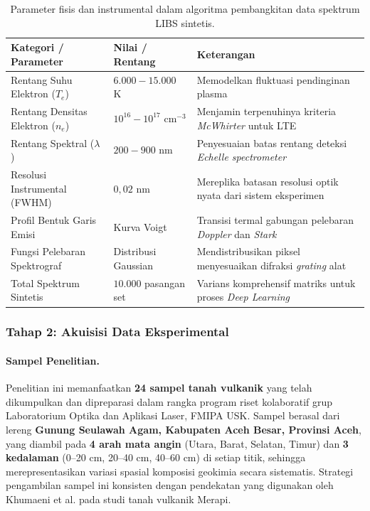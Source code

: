 \documentclass[12pt, a4paper]{article}
\begin{document}
\begin{table}[htbp]
\centering
\caption{Parameter fisis dan instrumental dalam algoritma pembangkitan data spektrum LIBS sintetis.}
\label{tab:parameter-simulasi}
\small
\begin{tabular}{llp{5.5cm}}
\toprule
\textbf{Kategori / Parameter} & \textbf{Nilai / Rentang} & \textbf{Keterangan} \\
\midrule
Rentang Suhu Elektron ($T_e$) & $6.000 - 15.000$ K & Memodelkan fluktuasi pendinginan plasma \cite{cristoforetti2010} \\
Rentang Densitas Elektron ($n_e$) & $10^{16} - 10^{17}$ cm$^{-3}$ & Menjamin terpenuhinya kriteria \textit{McWhirter} untuk LTE \\
Rentang Spektral ($\lambda$) & $200 - 900$ nm & Penyesuaian batas rentang deteksi \textit{Echelle spectrometer} \\
Resolusi Instrumental (FWHM) & $0{,}02$ nm & Mereplika batasan resolusi optik nyata dari sistem eksperimen \\
Profil Bentuk Garis Emisi & Kurva Voigt & Transisi termal gabungan pelebaran \textit{Doppler} dan \textit{Stark} \\
Fungsi Pelebaran Spektrograf & Distribusi Gaussian & Mendistribusikan piksel menyesuaikan difraksi \textit{grating} alat \\
Total Spektrum Sintetis & $10.000$ pasangan set & Varians komprehensif matriks untuk proses \textit{Deep Learning} \\
\bottomrule
\end{tabular}
\end{table}

\subsubsection{Tahap 2: Akuisisi Data Eksperimental}

\paragraph{Sampel Penelitian.}
Penelitian ini memanfaatkan \textbf{24 sampel tanah vulkanik} yang telah dikumpulkan dan dipreparasi dalam rangka program riset kolaboratif grup Laboratorium Optika dan Aplikasi Laser, FMIPA USK. Sampel berasal dari lereng \textbf{Gunung Seulawah Agam, Kabupaten Aceh Besar, Provinsi Aceh}, yang diambil pada \textbf{4 arah mata angin} (Utara, Barat, Selatan, Timur) dan \textbf{3 kedalaman} (0--20 cm, 20--40 cm, 40--60 cm) di setiap titik, sehingga merepresentasikan variasi spasial komposisi geokimia secara sistematis. Strategi pengambilan sampel ini konsisten dengan pendekatan yang digunakan oleh Khumaeni et al. \cite{khumaeni2025} pada studi tanah vulkanik Merapi.
\end{document}
